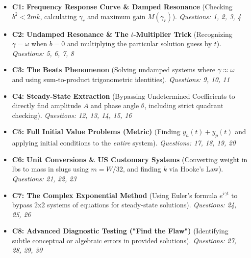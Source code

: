 \documentclass[11pt]{article}
\begin{document}
\begin{itemize}
    \item \textbf{C1: Frequency Response Curve \& Damped Resonance} (Checking $b^2 < 2mk$, calculating $\gamma_r$ and maximum gain $M(\gamma_r)$). \textit{Questions: 1, 2, 3, 4}
    \item \textbf{C2: Undamped Resonance \& The $t$-Multiplier Trick} (Recognizing $\gamma = \omega$ when $b=0$ and multiplying the particular solution guess by $t$). \textit{Questions: 5, 6, 7, 8}
    \item \textbf{C3: The Beats Phenomenon} (Solving undamped systems where $\gamma \approx \omega$ and using sum-to-product trigonometric identities). \textit{Questions: 9, 10, 11}
    \item \textbf{C4: Steady-State Extraction} (Bypassing Undetermined Coefficients to directly find amplitude $A$ and phase angle $\theta$, including strict quadrant checking). \textit{Questions: 12, 13, 14, 15, 16}
    \item \textbf{C5: Full Initial Value Problems (Metric)} (Finding $y_h(t) + y_p(t)$ and applying initial conditions to the \textit{entire} system). \textit{Questions: 17, 18, 19, 20}
    \item \textbf{C6: Unit Conversions \& US Customary Systems} (Converting weight in lbs to mass in slugs using $m = W/32$, and finding $k$ via Hooke's Law). \textit{Questions: 21, 22, 23}
    \item \textbf{C7: The Complex Exponential Method} (Using Euler's formula $e^{i\gamma t}$ to bypass 2x2 systems of equations for steady-state solutions). \textit{Questions: 24, 25, 26}
    \item \textbf{C8: Advanced Diagnostic Testing ("Find the Flaw")} (Identifying subtle conceptual or algebraic errors in provided solutions). \textit{Questions: 27, 28, 29, 30}
\end{itemize}
\end{document}
